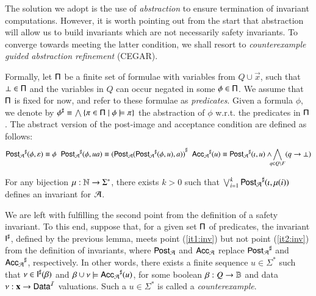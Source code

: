 \documentclass{llncs}
\begin{document}
The solution we adopt is the use of \emph{abstraction} to ensure
termination of invariant computations. However, it is worth pointing
out from the start that abstraction will allow us to build invariants
which are not necessarily safety invariants. To converge towards
meeting the latter condition, we shall resort to \emph{counterexample
  guided abstraction refinement} (CEGAR). 

Formally, let $\mathsf{\Pi}$ be a finite set of formulae with variables from
$Q \cup \vec{x}$, such that $\bot \in \mathsf{\Pi}$ and the variables in $Q$
can occur negated in some $\phi \in \mathsf{\Pi}$. We assume that $\mathsf{\Pi}$
is fixed for now, and refer to these formulae as \emph{predicates}.
Given a formula $\phi$, we denote by ${\phi}^\sharp \equiv \bigwedge
\left\{ \pi \in \mathsf{\Pi} \mid \phi \models \pi \right\}$ the abstraction of $\phi$
w.r.t. the predicates in $\mathsf{\Pi}$. The abstract version of the
post-image and acceptance condition are defined as follows:
{\footnotesize\[ {\mathsf{Post}_{\mathcal{A}}}^\sharp(\phi,\varepsilon) \equiv \phi
\hspace*{2mm}
{\mathsf{Post}_{\mathcal{A}}}^\sharp(\phi,ua) \equiv {(\mathsf{Post}_{\mathcal{A}}({\mathsf{Post}_{\mathcal{A}}}^\sharp(\phi,u),a))}^\sharp 
\hspace*{2mm}
{\mathsf{Acc}_{\mathcal{A}}}^\sharp(u) \equiv {\mathsf{Post}_{\mathcal{A}}}^\sharp(\iota,u) \wedge\!\!\!\bigwedge_{q \in Q \setminus F} 
(q \rightarrow \bot)\]}
\begin{lemma}\label{lemma:abstract-invariant}
  For any bijection $\mu : {\bf \mathbb{N}} \rightarrow \Sigma^*$, there exists
  $k>0$ such that $\bigvee_{i=1}^k {\mathsf{Post}_{\mathcal{A}}}^\sharp(\iota,\mu(i))$ defines
  an invariant for $\mathcal{A}$. 
\end{lemma}

We are left with fulfilling the second point from the definition of a
safety invariant. To this end, suppose that, for a given set $\mathsf{\Pi}$
of predicates, the invariant ${\mathsf{I}}^\sharp$, defined by the previous
lemma, meets point (\ref{it1:inv}) but not point (\ref{it2:inv}) from
the definition of invariants, where $\mathsf{Post}_{\mathcal{A}}$ and $\mathsf{Acc}_{\mathcal{A}}$
replace ${\mathsf{Post}_{\mathcal{A}}}^\sharp$ and ${\mathsf{Acc}_{\mathcal{A}}}^\sharp$, respectively. In
other words, there exists a finite sequence $u \in \Sigma^*$ such that
$\nu \in {\mathsf{I}}^\sharp(\beta)$ and $\beta\cup\nu \models
{\mathsf{Acc}_{\mathcal{A}}}^\sharp(u)$, for some boolean $\beta : Q \rightarrow \mathbb{B}$
and data $\nu : \mathbf x \rightarrow \mathsf{Data}^{\mathcal{I}}$ valuations. Such
a $u\in\Sigma^*$ is called a \emph{counterexample}.
\end{document}
